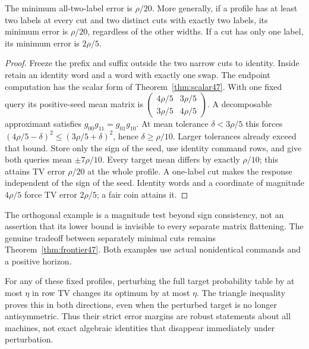 \begin{proposition}
\label{prop:orthogonal49}
The minimum all-two-label error is $\rho/20$. More generally, if a
profile has at least two labels at every cut and two distinct cuts
with exactly two labels, its minimum error is $\rho/20$, regardless
of the other widths. If a cut has only one label, its minimum error
is $2\rho/5$.
\end{proposition}
\begin{proof}
Freeze the prefix and suffix outside the two narrow cuts to identity.
Inside retain an identity word and a word with exactly one swap.
The endpoint computation has the scalar form of
Theorem~\ref{thm:scalar47}. With one fixed query its positive-seed
mean matrix is
$\left(\begin{smallmatrix}4\rho/5&3\rho/5\\
3\rho/5&4\rho/5\end{smallmatrix}\right)$.
A decomposable approximant satisfies $g_{00}g_{11}=g_{01}g_{10}$.
At mean tolerance $\delta<3\rho/5$ this forces
$(4\rho/5-\delta)^2\le(3\rho/5+\delta)^2$, hence
$\delta\ge\rho/10$. Larger tolerances already exceed that bound.
Store only the sign of the seed, use identity command rows, and give
both queries mean $\pm7\rho/10$. Every target mean differs by exactly
$\rho/10$; this attains TV error $\rho/20$ at the whole profile.
A one-label cut makes the response independent of the sign of the
seed. Identity words and a coordinate of magnitude $4\rho/5$ force
TV error $2\rho/5$; a fair coin attains it.
\end{proof}

The orthogonal example is a magnitude test beyond sign consistency,
not an assertion that its lower bound is invisible to every separate
matrix flattening. The genuine tradeoff between separately minimal
cuts remains Theorem~\ref{thm:frontier47}. Both examples use actual
nonidentical commands and a positive horizon.

For any of these fixed profiles, perturbing the full target probability
table by at most $\eta$ in row TV changes its optimum by at most $\eta$.
The triangle inequality proves this in both directions, even when the
perturbed target is no longer antisymmetric. Thus their strict error
margins are robust statements about all machines, not exact algebraic
identities that disappear immediately under perturbation.
